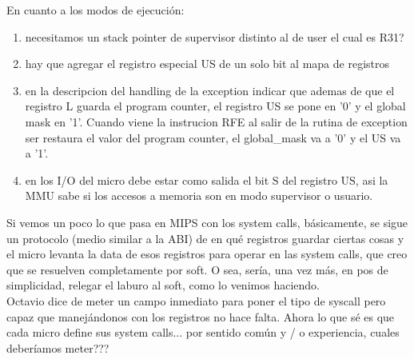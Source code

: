 En cuanto a los modos de ejecución:
\begin{enumerate}
 \item necesitamos un stack pointer de supervisor distinto al de user el cual es R31?
 \item hay que agregar el registro especial US de un solo bit al mapa de registros
 \item en la descripcion del handling de la exception indicar que ademas de que el registro
   L guarda el program counter, el registro US se pone en '0' y el global mask en '1'.
   Cuando viene la instrucion RFE al salir de la rutina de exception ser restaura el
   valor del program counter, el global\_mask va a '0' y el US va a '1'.
 \item en los I/O del micro debe estar como salida el bit S del registro US, asi la MMU sabe
   si los accesos a memoria son en modo supervisor o usuario.
\end{enumerate}

Si vemos un poco lo que pasa en MIPS con los system calls, básicamente, se sigue un protocolo (medio similar a la ABI) de en qué registros
guardar ciertas cosas y el micro levanta la data de esos registros para operar en las system calls, que creo que se resuelven completamente
por soft. O sea, sería, una vez más, en pos de simplicidad, relegar el laburo al soft, como lo venimos haciendo.\\
Octavio dice de meter un campo inmediato para poner el tipo de syscall pero capaz que manejándonos con los registros no hace falta. Ahora
lo que sé es que cada micro define sus system calls... por sentido común y / o experiencia, cuales deberíamos meter???